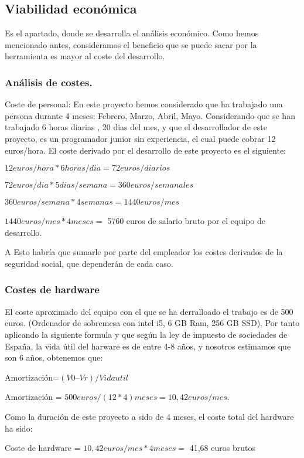 \subsection{Viabilidad económica}
Es el apartado, donde se desarrolla el análisis económico. Como hemos mencionado antes, consideramos el beneficio que se puede sacar por la herramienta es mayor al coste del desarrollo.

\subsubsection{Análisis de costes.}
Coste de personal: 
En este proyecto hemos considerado que ha trabajado una persona durante 4 meses: Febrero, Marzo, Abril, Mayo. Considerando que se han trabajado 6 horas diarias , 20 dias del mes, y que el desarrollador de este proyecto, es un programador junior sin experiencia, el cual puede cobrar 12 euros/hora. El coste derivado por el desarrollo de este proyecto es el siguiente:

$12 euros / hora * 6 horas/ dia = 72  euros / diarios$

$72 euros / dia * 5 dias / semana  = 360 euros/ semanales$

$360 euros /semana * 4 semanas = 1440 euros / mes$

$1440 euros/mes * 4 meses= $ 5760 euros de salario bruto por el equipo de desarrollo.

A Esto habría que sumarle por parte del empleador los costes derivados de la seguridad social, que dependerán de cada caso.




\subsubsection{Costes de hardware}
El coste aproximado del equipo con el que se ha derralloado el trabajo es de 500 euros. 
(Ordenador de sobremesa con intel i5, 6 GB Ram, 256 GB SSD). Por tanto aplicando la siguiente formula y que según la ley de impuesto de sociedades de España, la vida útil del harware es de entre 4-8 años, y nosotros estimamos que son 6 años, obtenemos que:

Amortización=$( V0 – Vr ) /  Vida util$

Amortización = $500 euros / (12*4) meses = 10,42 euros / mes.$

Como la duración de este proyecto a sido de 4 meses, el coste total del hardware ha sido:

Coste de hardware = $10,42 euros / mes * 4 meses=$ 41,68 euros brutos

